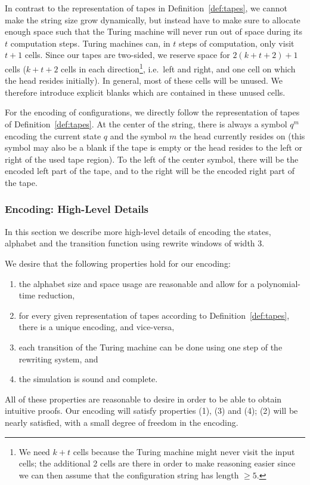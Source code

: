 \documentclass[a4paper,UKenglish,cleveref, autoref]{lipics-v2019}
\begin{document}
In contrast to the representation of tapes in Definition~\ref{def:tapes}, we cannot make the string size grow dynamically, but instead have to make sure to allocate enough space such that the Turing machine will never run out of space during its $t$ computation steps. Turing machines can, in $t$ steps of computation, only visit $t+1$ cells. Since our tapes are two-sided, we reserve space for $2(k + t + 2)+1$ cells ($k + t + 2$ cells in each direction\footnote{We need $k+t$ cells because the Turing machine might never visit the input cells; the additional 2 cells are there in order to make reasoning easier since we can then assume that the configuration string has length $\ge 5$.}, i.e.\ left and right, and one cell on which the head resides initially).
In general, most of these cells will be unused. We therefore introduce explicit blanks \blank{} which are contained in these unused cells.

For the encoding of configurations, we directly follow the representation of tapes of Definition~\ref{def:tapes}.
At the center of the string, there is always a symbol $q^m$ encoding the current state $q$ and the symbol $m$ the head currently resides on (this symbol may also be a blank \blank{} if the tape is empty or the head resides to the left or right of the used tape region). 
To the left of the center symbol, there will be the encoded left part of the tape, and to the right will be the encoded right part of the tape. 

\newcommand{\polneg}[1]{\overleftarrow{#1}}
\newcommand{\polpos}[1]{\overrightarrow{#1}}
\newcommand{\polneut}[1]{\overline{#1}}
\subsubsection{Encoding: High-Level Details}\label{sec:rewrules}
In this section we describe more high-level details of encoding the states, alphabet and the transition function using rewrite windows of width 3. 

We desire that the following properties hold for our encoding:
\begin{enumerate}
  \item the alphabet size and space usage are reasonable and allow for a polynomial-time reduction,
  \item for every given representation of tapes according to Definition~\ref{def:tapes}, there is a unique encoding, and vice-versa,
  \item each transition of the Turing machine can be done using one step of the rewriting system, and
  \item the simulation is sound and complete.
\end{enumerate}
All of these properties are reasonable to desire in order to be able to obtain intuitive proofs.
Our encoding will satisfy properties (1), (3) and (4); (2) will be nearly satisfied, with a small degree of freedom in the encoding.
\end{document}
